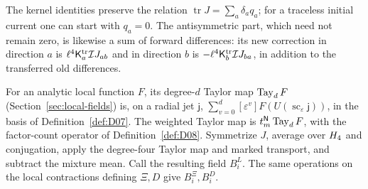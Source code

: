The kernel identities preserve the relation $\operatorname{tr}J=\sum_a\delta_aq_a$; for a traceless initial current one can start with $q_a=0$. The antisymmetric part, which need not remain zero, is likewise a sum of forward differences: its new correction in direction $a$ is $\ell^4\mathsf K_a^{\rm tr}\mathcal IJ_{ab}$ and in direction $b$ is $-\ell^4\mathsf K_b^{\rm tr}\mathcal IJ_{ba}$, in addition to the transferred old differences.

For an analytic local function $F$, its degree-$d$ Taylor map $\operatorname{Tay}_dF$ (Section~\ref{sec:local-fields}) is, on a radial jet $\mathsf j$, $\sum_{v=0}^d[\varepsilon^v]F(U(\operatorname{sc}_\varepsilon\mathsf j))$, in the basis of Definition~\ref{def:D07}. The weighted Taylor map is $t_m^{\mathsf{N}}\operatorname{Tay}_dF$, with the factor-count operator of Definition~\ref{def:D08}. Symmetrize $J$, average over $H_4$ and conjugation, apply the degree-four Taylor map and marked transport, and subtract the mixture mean. Call the resulting field $B_i^L$. The same operations on the local contractions defining $\Xi,D$ give $B_i^\Xi,B_i^D$.

